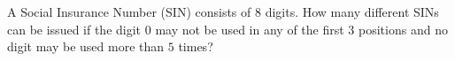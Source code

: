 A Social Insurance Number (SIN) consists of $8$ digits. How many different SINs can be issued if the digit $0$ may not be used in any of the first $3$ positions and no digit may be used more than $5$ times?
